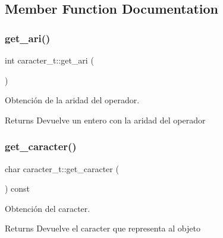 \subsection{Member Function Documentation}
\mbox{\label{classcaracter__t_a6226f271e775dc48d36e29f5d2005f5b}} 
\subsubsection{\texorpdfstring{get\+\_\+ari()}{get\_ari()}}
{\footnotesize\ttfamily int caracter\+\_\+t\+::get\+\_\+ari (\begin{DoxyParamCaption}{ }\end{DoxyParamCaption})\hspace{0.3cm}{\ttfamily [inline]}}



Obtención de la aridad del operador. 

\begin{DoxyReturn}{Returns}
Devuelve un entero con la aridad del operador 
\end{DoxyReturn}
\mbox{\label{classcaracter__t_ab743675dd1000f161881b568c137fd8d}} 
\subsubsection{\texorpdfstring{get\+\_\+caracter()}{get\_caracter()}}
{\footnotesize\ttfamily char caracter\+\_\+t\+::get\+\_\+caracter (\begin{DoxyParamCaption}{ }\end{DoxyParamCaption}) const}



Obtención del caracter. 

\begin{DoxyReturn}{Returns}
Devuelve el caracter que representa al objeto 
\end{DoxyReturn}
\mbox{\label{classcaracter__t_a1b49616f0115a77c94bfd747e7f128f3}} 
